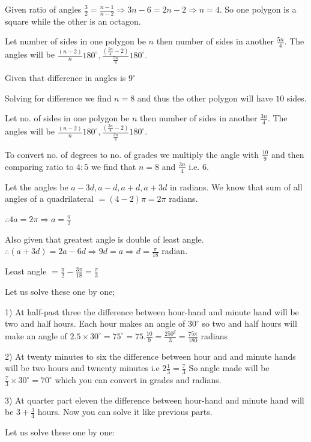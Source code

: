     Given ratio of angles $\frac{3}{2} = \frac{n -1}{n - 2} \Rightarrow 3n - 6 = 2n -2 \Rightarrow n = 4.$ So one polygon is
    a square while the other is an octagon.
\item Let number of sides in one polygon be $n$ then number of sides in another $\frac{5n}{4}.$ The angles will be
    $\frac{(n - 2)}{n}180^\circ, \frac{(\frac{5n}{4} - 2)}{\frac{5n}{4}}180^\circ.$

    Given that difference in angles is $9^\circ$

    Solving for difference we find $n = 8$ and thus the other polygon will have $10$ sides.
\item Let no. of sides in one polygon be $n$ then number of sides in another $\frac{3n}{4}$. The angles will be
    $\frac{(n - 2)}{n}180^\circ, \frac{(\frac{3n}{4} -2)}{\frac{3n}{4}}180^\circ.$

    To convert no. of degrees to no. of grades we multiply the angle with $\frac{10}{9}$ and then comparing ratio to
    $4:5$ we find that $n = 8$ and $\frac{3n}{4}$ i.e. $6.$
\item Let the angles be $a - 3d, a - d, a + d, a + 3d$ in radians. We know that sum of all angles of a quadrilateral $=
    (4 - 2)\pi = 2\pi$ radians.

    $\therefore 4a = 2\pi \Rightarrow a = \frac{\pi}{2}$

    Also given that greatest angle is double of least angle. $\therefore (a + 3d) = 2a - 6d \Rightarrow 9d = a \Rightarrow d
    = \frac{\pi}{18}$ radian.

    Least angle $= \frac{\pi}{2} - \frac{3\pi}{18} = \frac{\pi}{3}$
\item Let us solve these one by one;

    1) At half-past three the difference between hour-hand and minute hand will be two and half hours. Each hour makes an angle of
       $30^\circ$ so two and half hours will make an angle of $2.5\times 30^\circ = 75^\circ = 75.\frac{10}{9} =
       \frac{250^g}{3} = \frac{75\pi}{180}$ radians

    2) At twenty minutes to six the difference between hour and and minute hands will be two hours and twnenty minutes i.e
       $2\frac{1}{3} = \frac{7}{3}$ So angle made will be $\frac{7}{3}\times 30^\circ = 70^\circ$ which you can convert
       in grades and radians.

    3) At quarter part eleven the difference between hour-hand and minute hand will be $3 + \frac{3}{4}$ hours. Now you can
       solve it like previous parts.
\item Let us solve these one by one:

